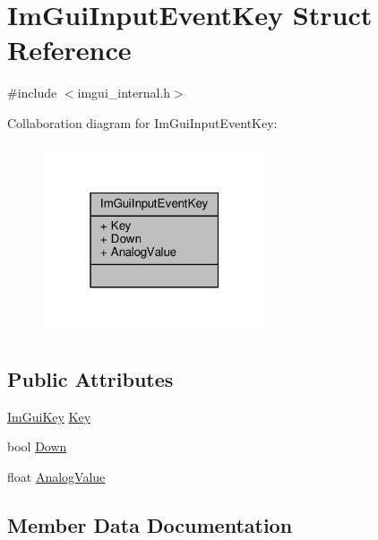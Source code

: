 \hypertarget{structImGuiInputEventKey}{}\section{Im\+Gui\+Input\+Event\+Key Struct Reference}
\label{structImGuiInputEventKey}


{\ttfamily \#include $<$imgui\+\_\+internal.\+h$>$}



Collaboration diagram for Im\+Gui\+Input\+Event\+Key\+:
\nopagebreak
\begin{figure}[H]
\begin{center}
\leavevmode
\includegraphics[width=187pt]{structImGuiInputEventKey__coll__graph}
\end{center}
\end{figure}
\subsection*{Public Attributes}
\begin{DoxyCompactItemize}
\item 
\hyperlink{imgui_8h_aa22ffe36b188427d712447ec465203d4}{Im\+Gui\+Key} \hyperlink{structImGuiInputEventKey_aa4efa74612b817e41b2a73f2f0d41b1c}{Key}
\item 
bool \hyperlink{structImGuiInputEventKey_a44a873572239dde28b0e332b6e8582bf}{Down}
\item 
float \hyperlink{structImGuiInputEventKey_a4f464b98784a0b94e33a5b4a55b03bc0}{Analog\+Value}
\end{DoxyCompactItemize}


\subsection{Member Data Documentation}
\mbox{\label{structImGuiInputEventKey_a4f464b98784a0b94e33a5b4a55b03bc0}} 
